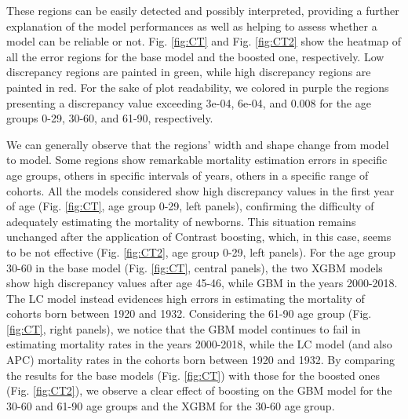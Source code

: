\documentclass[a4,11pt]{article}
\begin{document}
These regions can be easily detected and possibly interpreted, providing a further explanation of the model performances as well as helping to assess whether a model can be reliable or not. Fig. \ref{fig:CT} and Fig. \ref{fig:CT2} show the heatmap of all the error regions for the base model and the boosted one, respectively. Low discrepancy regions are painted in green, while high discrepancy regions are painted in red. 
For the sake of plot readability, we colored in purple the regions presenting a discrepancy value exceeding 3e-04, 6e-04, and 0.008 for the age groups 0-29, 30-60, and 61-90, respectively.

We can generally observe that the regions’ width and shape change from model to model. Some regions show remarkable mortality estimation errors in specific age groups, others in specific intervals of years, others in a specific range of cohorts. 
All the models considered show high discrepancy values in the first year of age (Fig. \ref{fig:CT}, age group 0-29, left panels), confirming the difficulty of adequately estimating the mortality of newborns. This situation remains unchanged after the application of Contrast boosting, which, in this case, seems to be not effective (Fig. \ref{fig:CT2}, age group 0-29, left panels).
For the age group 30-60 in the base model (Fig. \ref{fig:CT}, central panels), the two XGBM models show high discrepancy values after age 45-46, while GBM in the years 2000-2018. The LC model instead evidences high errors in estimating the mortality of cohorts born between 1920 and 1932. Considering the 61-90 age group (Fig. \ref{fig:CT}, right panels), we notice that the GBM model continues to fail in estimating mortality rates in the years 2000-2018, while the LC model (and also APC) mortality rates in the cohorts born between 1920 and 1932.
By comparing the results for the base models (Fig. \ref{fig:CT}) with those for the boosted ones (Fig. \ref{fig:CT2}), we observe a clear effect of boosting on the GBM model for the 30-60 and 61-90 age groups and the XGBM for the 30-60 age group.
\end{document}

